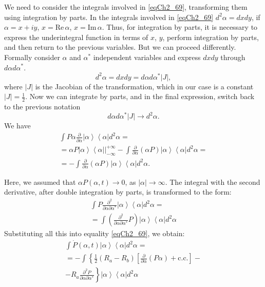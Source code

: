 We need to consider the integrals involved in \eqref{eqCh2_69},
transforming them using integration by parts.
In the integrals involved in \eqref{eqCh2_69} $d^2\alpha = dx dy$, if $\alpha = x + i y$, $x = \text{Re}\,\alpha$, $x = \text{Im}\,\alpha$.
Thus, for integration by parts, it is necessary to express the underintegral function in terms of $x$, $y$, perform integration by parts, and then return to the previous variables. But we can proceed
differently. Formally consider $\alpha$ and $\alpha^{*}$ independent variables and express $dx dy$ through $d\alpha d\alpha^{*}$.
\[
d^2\alpha = dx dy = d\alpha d\alpha^{*} \left|J\right|,
\]
where $\left|J\right|$ is the Jacobian of the transformation, which in our case is a constant $\left|J\right| = \frac{1}{2}$. Now we can integrate by parts, and in the final expression, switch back to the previous notation 
\[
d\alpha d\alpha^{*} \left|J\right| \rightarrow d^2\alpha.
\]
We have  
\begin{eqnarray}
\int P \alpha \frac{\partial}{\partial \alpha}
\left|\alpha\right>\left<\alpha\right| 
d^2 \alpha = 
\nonumber \\
= \left.\alpha P \left|\alpha\right>\left<\alpha\right|
\right|_{-\infty}^{+\infty} - 
\int \frac{\partial}{\partial \alpha}\left(\alpha P\right)
\left|\alpha\right>\left<\alpha\right|d^2 \alpha = 
\nonumber \\
= 
- \int \frac{\partial}{\partial \alpha}\left(\alpha P\right)
\left|\alpha\right>\left<\alpha\right|d^2 \alpha.
\label{eqCh2_70}
\end{eqnarray}

Here, we assumed that $\alpha P\left(\alpha, t\right) \rightarrow 0$, as $\left|\alpha\right| \rightarrow \infty$. The integral with the second derivative, after double integration by parts, is transformed to the form: 
\begin{eqnarray}
\int P \frac{\partial^2}{\partial \alpha \partial \alpha^{*}}
\left|\alpha\right>\left<\alpha\right| 
d^2 \alpha = 
\nonumber \\
= \int \left(\frac{\partial^2}{\partial \alpha \partial \alpha^{*}}
P\right) \left|\alpha\right>\left<\alpha\right|  
d^2 \alpha
\label{eqCh2_71}
\end{eqnarray}
Substituting all this into equality \eqref{eqCh2_69}, we obtain:
\begin{eqnarray}
\int \dot{P} \left(\alpha, t\right) 
\left|\alpha\right>\left<\alpha\right| 
d^2 \alpha = 
\nonumber \\
= - \int \left\{
\frac{1}{2}\left(R_a - R_b\right)
\left[
\frac{\partial}{\partial \alpha}
\left(P \alpha\right) + \text{c.c.}
\right]
\right.
-
\nonumber \\
- \left.
R_a \frac{\partial^2 P}{\partial \alpha \partial \alpha^{*}}
\right\}
\left|\alpha\right>\left<\alpha\right| 
d^2 \alpha
\label{eqCh2_72}
\end{eqnarray}

